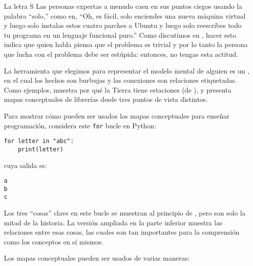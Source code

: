 \begin{aside}{La letra S}
 Las personas expertas a menudo caen en sus puntos ciegos usando la palabra ``solo,''
  como en,
  ``Oh, es fácil, solo enciendes una nueva máquina virtual
  y luego solo instalas estos cuatro parches a Ubuntu
  y luego solo reescribes todo tu programa en un lenguaje funcional puro.''
  Como discutimos en ,
  hacer esto indica que quien habla piensa que el problema es trivial
  y por lo tanto la persona que lucha con el problema debe ser estúpida:
  entonces, no tengas esta actitud.


\end{aside}


La herramienta que elegimos para representar el modelo mental de alguien es un ,
en el cual los hechos son burbujas y las conexiones son relaciones etiquetadas.
Como ejemplos,
 muestra por qué la Tierra tiene estaciones (de ),
y  presenta mapas conceptuales de librerías desde tres puntos de vista distintos.


Para mostrar cómo pueden ser usados los mapas conceptuales para enseñar programación,
considera este \texttt{for} bucle en Python:

\begin{verbatim}
for letter in "abc":
    print(letter)
\end{verbatim}

\noindent
cuya salida es:

\begin{verbatim}
a
b
c
\end{verbatim}

Los tres ``cosas'' clave en este bucle se muestran al principio de ,
pero son solo la mitad de la historia.
La versión ampliada en la parte inferior muestra las relaciones entre esas cosas,
las cuales son tan importantes para la comprensión como los conceptos en sí mismos.


\newpage
Los mapas conceptuales pueden ser usados de varias maneras:


